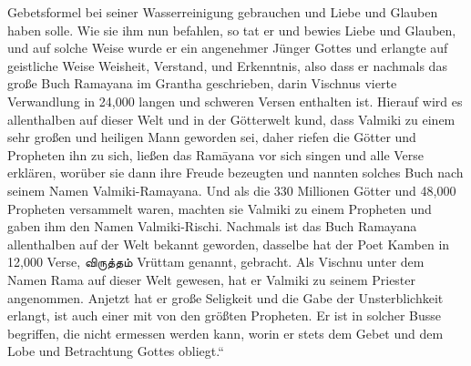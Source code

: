 \documentclass{article}
\newcommand{\TamilText}[1]{\texttamil{#1}}
\newcommand{\tam}[1]{\TamilText{#1}}
\begin{document}
Gebetsformel bei seiner Wasserreinigung gebrauchen und Liebe und Glauben haben solle. Wie sie ihm nun befahlen, so tat er und bewies Liebe und Glauben, und auf solche Weise wurde er ein angenehmer Jünger Gottes und erlangte auf geistliche Weise Weisheit, Verstand, und Erkenntnis, also dass er nachmals das große Buch Ramayana im Grantha geschrieben, darin Vischnus vierte Verwandlung in 24,000 langen und schweren Versen enthalten ist. Hierauf wird es allenthalben auf dieser Welt und in der Götterwelt kund, dass Valmiki zu einem sehr großen und heiligen Mann geworden sei, daher riefen die Götter und Propheten ihn zu sich, ließen das Ram\={a}yana vor sich singen und alle Verse erklären, worüber sie dann ihre Freude bezeugten und nannten solches Buch nach seinem Namen Valmiki-Ramayana. Und als die 330 Millionen Götter und 48,000 Propheten versammelt waren, machten sie Valmiki zu einem Propheten und gaben ihm den Namen Valmiki-Rischi. Nachmals ist das Buch Ramayana allenthalben auf der Welt bekannt geworden, dasselbe hat der Poet Kamben in 12,000 Verse, \tam{விருத்தம்} Vrüttam genannt, gebracht. Als Vischnu unter dem Namen Rama auf dieser Welt gewesen, hat er Valmiki zu seinem Priester angenommen. Anjetzt hat er große Seligkeit und die Gabe der Unsterblichkeit erlangt, ist auch einer mit von den größten Propheten. Er ist in solcher Busse begriffen, die nicht ermessen werden kann, worin er stets dem Gebet und dem Lobe und Betrachtung Gottes obliegt.“
\end{document}
